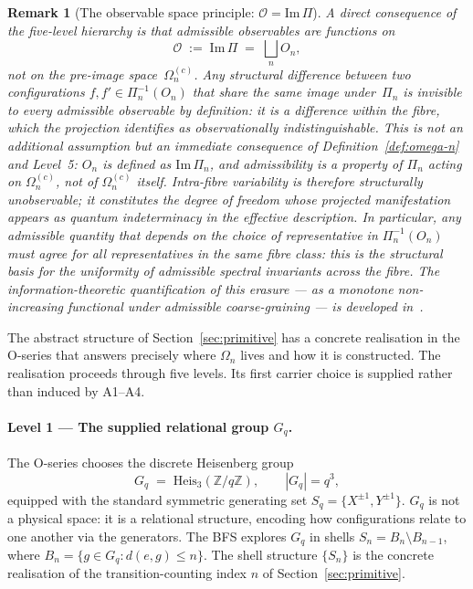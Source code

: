 \documentclass[11pt,a4paper]{article}
\newtheorem{remark}[theorem]{Remark}
\begin{document}
    \begin{remark}[The observable space principle: $\mathcal{O} = \mathrm{Im}\,\Pi$]
      \label{rem:observable-space}
      A direct consequence of the five-level hierarchy is that admissible
      observables are functions on
      \begin{equation}
        \mathcal{O} \;:=\; \mathrm{Im}\,\Pi
        \;=\; \bigsqcup_{n} O_n,
      \end{equation}
      not on the pre-image space~$\Omega_n^{(c)}$.
      Any structural difference between two configurations
      $f, f' \in \Pi_n^{-1}(O_n)$ that share the same image under~$\Pi_n$
      is invisible to every admissible observable by definition:
      it is a difference \emph{within} the fibre, which the projection
      identifies as observationally indistinguishable.
      This is not an additional assumption but an immediate consequence of
      Definition~\ref{def:omega-n} and Level~5:
      $O_n$ is defined as $\mathrm{Im}\,\Pi_n$, and admissibility is
      a property of $\Pi_n$ acting on $\Omega_n^{(c)}$, not of
      $\Omega_n^{(c)}$ itself.
      Intra-fibre variability is therefore structurally unobservable; it
      constitutes the degree of freedom whose projected manifestation appears
      as quantum indeterminacy in the effective description.
      In particular, any admissible quantity that depends on the choice of
      representative in $\Pi_n^{-1}(O_n)$ must agree for all representatives
      in the same fibre class: this is the structural basis for the uniformity
      of admissible spectral invariants across the fibre.
      The information-theoretic quantification of this erasure ---
      as a monotone non-increasing functional under admissible coarse-graining
      --- is developed in~\cite{Beau2026fe}.
    \end{remark}


    \label{subsec:five-levels}

    The abstract structure of Section~\ref{sec:primitive} has a concrete realisation
    in the O-series that answers precisely where $\Omega_n$ lives and how it is
    constructed.
    The realisation proceeds through five levels.
    Its first carrier choice is supplied rather than induced by A1--A4.

    \paragraph{Level 1 — The supplied relational group $G_q$.}
      The O-series chooses the discrete Heisenberg group
      \begin{equation}
        G_q \;=\; \mathrm{Heis}_3(\mathbb{Z}/q\mathbb{Z}),
        \qquad |G_q| = q^3,
      \end{equation}
      equipped with the standard symmetric generating set $S_q = \{X^{\pm 1}, Y^{\pm 1}\}$.
      $G_q$ is not a physical space: it is a relational structure, encoding how
      configurations relate to one another via the generators.
      The BFS explores $G_q$ in shells $S_n = B_n \setminus B_{n-1}$, where
      $B_n = \{g \in G_q : d(e,g) \leq n\}$.
      The shell structure $\{S_n\}$ is the concrete realisation of the
      transition-counting index $n$ of Section~\ref{sec:primitive}.
\end{document}
